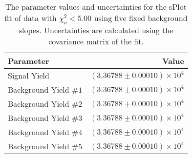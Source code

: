 
\begin{table}[ht]
    \begin{center}
        \begin{tabular}{lr}\toprule
            Parameter & Value \\\midrule
            Signal Yield & $(3.36788 \pm 0.00010) \times 10^{4}$ \\
            Background Yield $\#1$ & $(3.36788 \pm 0.00010) \times 10^{4}$ \\
            Background Yield $\#2$ & $(3.36788 \pm 0.00010) \times 10^{4}$ \\
            Background Yield $\#3$ & $(3.36788 \pm 0.00010) \times 10^{4}$ \\
            Background Yield $\#4$ & $(3.36788 \pm 0.00010) \times 10^{4}$ \\
            Background Yield $\#5$ & $(3.36788 \pm 0.00010) \times 10^{4}$ \\\bottomrule
        \end{tabular}
        \caption{The parameter values and uncertainties for the sPlot fit of data with $\chi^2_\nu < 5.00$ using five fixed background slopes. Uncertainties are calculated using the covariance matrix of the fit.}\label{tab:splot-fit-results-chisqdof-5.00-fixed-5}
    \end{center}
\end{table}
